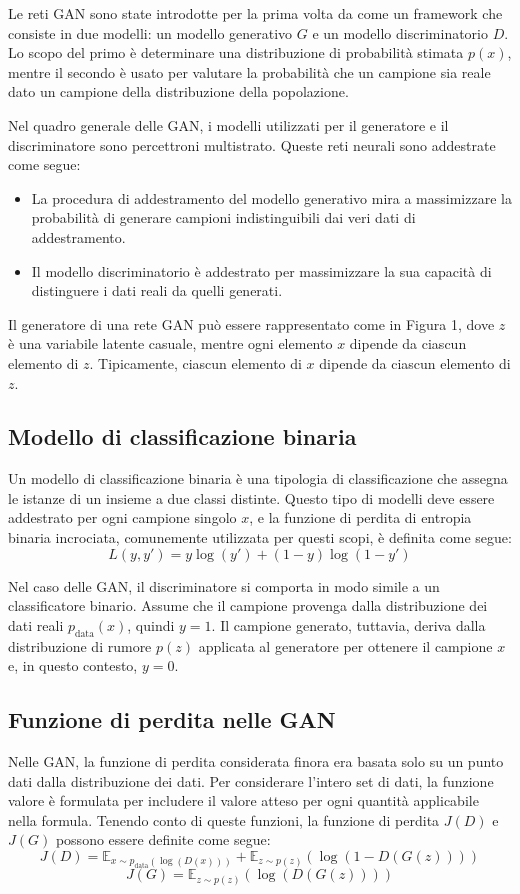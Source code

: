 Le reti GAN sono state introdotte per la prima volta da  come un framework che consiste in due modelli: un modello generativo \( G \) e un modello discriminatorio \( D \). Lo scopo del primo è determinare una distribuzione di probabilità stimata \( p(x) \), mentre il secondo è usato per valutare la probabilità che un campione sia reale dato un campione della distribuzione della popolazione.

Nel quadro generale delle GAN, i modelli utilizzati per il generatore e il discriminatore sono percettroni multistrato. Queste reti neurali sono addestrate come segue:
\begin{itemize}
  \item La procedura di addestramento del modello generativo mira a massimizzare la probabilità di generare campioni indistinguibili dai veri dati di addestramento.
  \item Il modello discriminatorio è addestrato per massimizzare la sua capacità di distinguere i dati reali da quelli generati.
\end{itemize}

Il generatore di una rete GAN può essere rappresentato come in Figura 1, dove \( z \) è una variabile latente casuale, mentre ogni elemento \( x \) dipende da ciascun elemento di \( z \). Tipicamente, ciascun elemento di \( x \) dipende da ciascun elemento di \( z \).

\subsection{Modello di classificazione binaria}
Un modello di classificazione binaria è una tipologia di classificazione che assegna le istanze di un insieme a due classi distinte. Questo tipo di modelli deve essere addestrato per ogni campione singolo \( x \), e la funzione di perdita di entropia binaria incrociata, comunemente utilizzata per questi scopi, è definita come segue:
\[
L(y, y') = y \log(y') + (1 - y) \log(1 - y')
\]

Nel caso delle GAN, il discriminatore si comporta in modo simile a un classificatore binario. Assume che il campione provenga dalla distribuzione dei dati reali \( p_{\text{data}}(x) \), quindi \( y = 1 \). Il campione generato, tuttavia, deriva dalla distribuzione di rumore \( p(z) \) applicata al generatore per ottenere il campione \( x \) e, in questo contesto, \( y = 0 \).

\subsection{Funzione di perdita nelle GAN}
Nelle GAN, la funzione di perdita considerata finora era basata solo su un punto dati dalla distribuzione dei dati. Per considerare l'intero set di dati, la funzione valore è formulata per includere il valore atteso per ogni quantità applicabile nella formula. Tenendo conto di queste funzioni, la funzione di perdita \( J(D) \) e \( J(G) \) possono essere definite come segue:
\[
J(D) = \mathbb{E}_{x \sim p_{\text{data}}(\log(D(x)))} + \mathbb{E}_{z \sim p(z)}(\log(1 - D(G(z))))
\]
\[
J(G) = \mathbb{E}_{z \sim p(z)}(\log(D(G(z))))
\]

